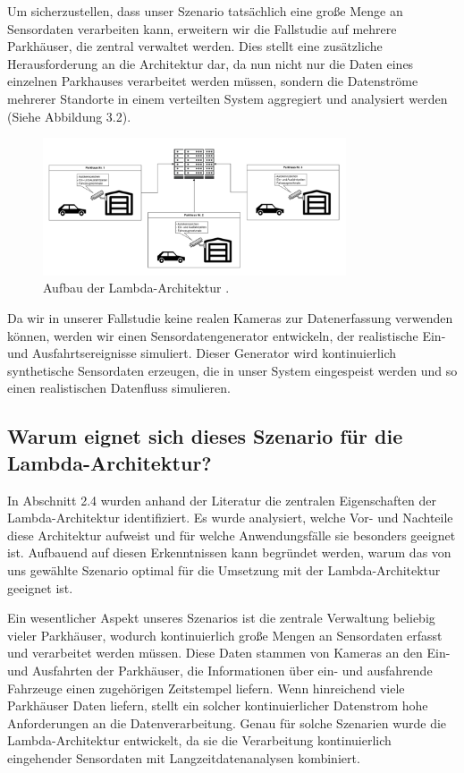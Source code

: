 Um sicherzustellen, dass unser Szenario tatsächlich eine große Menge an Sensordaten verarbeiten kann, erweitern wir die Fallstudie auf mehrere Parkhäuser, die zentral verwaltet werden. Dies stellt eine zusätzliche Herausforderung an die Architektur dar, da nun nicht nur die Daten eines einzelnen Parkhauses verarbeitet werden müssen, sondern die Datenströme mehrerer Standorte in einem verteilten System aggregiert und analysiert werden (Siehe Abbildung 3.2).

\begin{figure}[h] %
    \centering
    \includegraphics[width=0.8\textwidth]{Graphics/Parkhaus2.png} %
    \caption{Aufbau der Lambda-Architektur \cite{entwickler_lambda_kappa}.}
    \label{fig:beispielbild}
\end{figure}

Da wir in unserer Fallstudie keine realen Kameras zur Datenerfassung verwenden können, werden wir einen Sensordatengenerator entwickeln, der realistische Ein- und Ausfahrtsereignisse simuliert. Dieser Generator wird kontinuierlich synthetische Sensordaten erzeugen, die in unser System eingespeist werden und so einen realistischen Datenfluss simulieren.

\subsection{Warum eignet sich dieses Szenario für die Lambda-Architektur?}
In Abschnitt 2.4 wurden anhand der Literatur die zentralen Eigenschaften der Lambda-Architektur identifiziert. Es wurde analysiert, welche Vor- und Nachteile diese Architektur aufweist und für welche Anwendungsfälle sie besonders geeignet ist. Aufbauend auf diesen Erkenntnissen kann begründet werden, warum das von uns gewählte Szenario optimal für die Umsetzung mit der Lambda-Architektur geeignet ist.

Ein wesentlicher Aspekt unseres Szenarios ist die zentrale Verwaltung beliebig vieler Parkhäuser, wodurch kontinuierlich große Mengen an Sensordaten erfasst und verarbeitet werden müssen. Diese Daten stammen von Kameras an den Ein- und Ausfahrten der Parkhäuser, die Informationen über ein- und ausfahrende Fahrzeuge einen zugehörigen Zeitstempel liefern. Wenn hinreichend viele Parkhäuser Daten liefern, stellt ein solcher kontinuierlicher Datenstrom hohe Anforderungen an die Datenverarbeitung. Genau für solche Szenarien wurde die Lambda-Architektur entwickelt, da sie die Verarbeitung kontinuierlich eingehender Sensordaten mit Langzeitdatenanalysen kombiniert.

